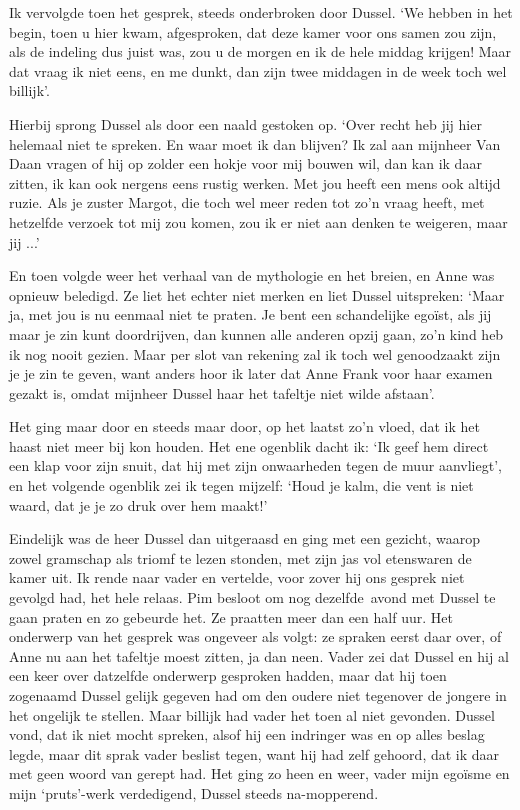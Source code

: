 \documentclass{book}
\begin{document}
Ik vervolgde toen het gesprek, steeds onderbroken door Dussel. `We hebben in het
begin, toen u hier kwam, afgesproken, dat deze kamer voor ons samen zou zijn,
als de indeling dus juist was, zou u de morgen en ik de hele middag krijgen!
Maar dat vraag ik niet eens, en me dunkt, dan zijn twee middagen in de week toch
wel billijk'.

Hierbij sprong Dussel als door een naald gestoken op. `Over recht heb jij hier
helemaal niet te spreken. En waar moet ik dan blijven? Ik zal aan mijnheer Van
Daan vragen of hij op zolder een hokje voor mij bouwen wil, dan kan ik daar
zitten, ik kan ook nergens eens rustig werken. Met jou heeft een mens ook altijd
ruzie. Als je zuster Margot, die toch wel meer reden tot zo'n vraag heeft, met
hetzelfde verzoek tot mij zou komen, zou ik er niet aan denken te weigeren, maar
jij ...'

En toen volgde weer het verhaal van de mythologie en het breien, en Anne was
opnieuw beledigd. Ze liet het echter niet merken en liet Dussel uitspreken:
`Maar ja, met jou is nu eenmaal niet te praten. Je bent een schandelijke egoïst,
als jij maar je zin kunt doordrijven, dan kunnen alle anderen opzij gaan, zo'n
kind heb ik nog nooit gezien. Maar per slot van rekening zal ik toch wel
genoodzaakt zijn je je zin te geven, want anders hoor ik later dat Anne Frank
voor haar examen gezakt is, omdat mijnheer Dussel haar het tafeltje niet wilde
afstaan'.

Het ging maar door en steeds maar door, op het laatst zo'n vloed, dat ik het
haast niet meer bij kon houden. Het ene ogenblik dacht ik: `Ik geef hem direct
een klap voor zijn snuit, dat hij met zijn onwaarheden tegen de muur aanvliegt',
en het volgende ogenblik zei ik tegen mijzelf: `Houd je kalm, die vent is niet
waard, dat je je zo druk over hem maakt!'

Eindelijk was de heer Dussel dan uitgeraasd en ging met een gezicht, waarop
zowel gramschap als triomf te lezen stonden, met zijn jas vol etenswaren de
kamer uit. Ik rende naar vader en vertelde, voor zover hij ons gesprek niet
gevolgd had, het hele relaas. Pim besloot om nog dezelfde~avond met Dussel te
gaan praten en zo gebeurde het. Ze praatten meer dan een half uur. Het onderwerp
van het gesprek was ongeveer als volgt: ze spraken eerst daar over, of Anne nu
aan het tafeltje moest zitten, ja dan neen. Vader zei dat Dussel en hij al een
keer over datzelfde onderwerp gesproken hadden, maar dat hij toen zogenaamd
Dussel gelijk gegeven had om den oudere niet tegenover de jongere in het
ongelijk te stellen. Maar billijk had vader het toen al niet gevonden.  Dussel
vond, dat ik niet mocht spreken, alsof hij een indringer was en op alles beslag
legde, maar dit sprak vader beslist tegen, want hij had zelf gehoord, dat ik
daar met geen woord van gerept had. Het ging zo heen en weer, vader mijn egoïsme
en mijn `pruts'-werk verdedigend, Dussel steeds na-mopperend.
\end{document}

